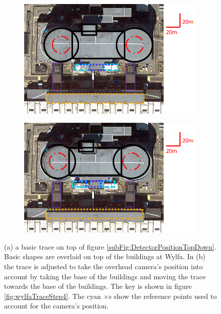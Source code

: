 \begin{figure}[!h]
\centering
\begin{subfigure}{.5\textwidth}
  \centering
  \includegraphics[width=\linewidth]{Chapter6/Figs/wylfaTraceStep1NoLeg.png}
  \captionsetup{width=.9\linewidth}
  \caption{}
  \label{subFig:wylfaTraceStep1}
\end{subfigure}%
\begin{subfigure}{.5\textwidth}
  \centering
\includegraphics[width=\linewidth]{Chapter6/Figs/wylfaTraceStep2NoLeg.png}
  \captionsetup{width=.9\linewidth}
  \caption{}
  \label{subFig:wylfaTraceStep2}
\end{subfigure}
\caption{(a) a basic trace on top of figure \ref{subFig:DetectorPositionTopDown}. Basic shapes are overlaid on top of the buildings at Wylfa. In (b) the trace is adjusted to take the overhead camera's position into account by taking the base of the buildings and moving the trace towards the base of the buildings. The key is shown in figure \ref{fig:wylfaTraceStep4}. The cyan $\times$s show the reference points used to account for the camera's position.}
\label{fig:wylfaTraceSteps1-2}
\end{figure}

